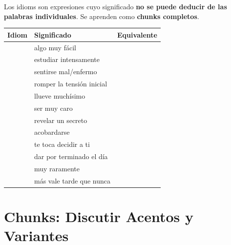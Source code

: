 \documentclass[12pt,a4paper]{article}
\begin{document}
\begin{cajachunk}
Los idioms son expresiones cuyo significado \textbf{no se puede deducir de las palabras individuales}. Se aprenden como \textbf{chunks completos}.

\medskip
\begin{tabularx}{\textwidth}{@{} l X l @{}}
\toprule
\textbf{Idiom} & \textbf{Significado} & \textbf{Equivalente} \\
\midrule
\eng{a piece of cake} & algo muy fácil & \esp{pan comido} \\
\eng{hit the books} & estudiar intensamente & \esp{hincar los codos} \\
\eng{under the weather} & sentirse mal/enfermo & \esp{estar pachuchо} \\
\eng{break the ice} & romper la tensión inicial & \esp{romper el hielo} \\
\eng{it's raining cats and dogs} & llueve muchísimo & \esp{llueve a cántaros} \\
\eng{cost an arm and a leg} & ser muy caro & \esp{costar un ojo de la cara} \\
\eng{let the cat out of the bag} & revelar un secreto & \esp{irse de la lengua} \\
\eng{get cold feet} & acobardarse & \esp{echarse para atrás} \\
\eng{the ball is in your court} & te toca decidir a ti & \esp{la pelota está en tu cancha} \\
\eng{call it a day} & dar por terminado el día & \esp{dar el día por terminado} \\
\eng{once in a blue moon} & muy raramente & \esp{de vez en cuando/de Pascuas a Ramos} \\
\eng{better late than never} & más vale tarde que nunca & \esp{más vale tarde que nunca} \\
\bottomrule
\end{tabularx}
\end{cajachunk}

\section{Chunks: Discutir Acentos y Variantes}
\end{document}
